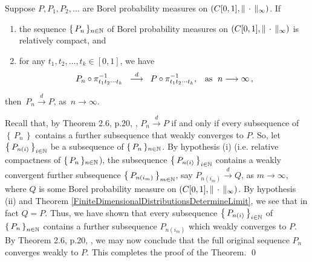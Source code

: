\begin{theorem}
\label{relativeCompactnessFiniteDimensionConvergenceImpliesWeakConvergence}
\mbox{}\vskip 0.1cm
\noindent
Suppose $P, P_{1}, P_{2}, \ldots $ are Borel probability measures on $\left(C[0,1],\Vert\,\cdot\,\Vert_{\infty}\right)$.
If
\begin{enumerate}
\item	the sequence $\{\,P_{n}\,\}_{n\in\mathbb{N}}$ of Borel probability measures
		on $\left(C[0,1],\Vert\,\cdot\,\Vert_{\infty}\right)$ is relatively compact, and
\item	for any $t_{1}, t_{2}, \ldots, t_{k} \in [0,1]$, we have
		\begin{equation*}
		P_{n}\circ\pi_{t_{1}t_{2}\cdots t_{k}}^{-1}
		\;\;\overset{d}{\longrightarrow}\;\;
		P\circ\pi_{t_{1}t_{2}\cdots t_{k}}^{-1},
		\;\;\;
		\textnormal{as \;$n \longrightarrow \infty$}\,,
		\end{equation*}
\end{enumerate}
then \,$P_{n} \overset{d}{\longrightarrow} P$, as \,$n \longrightarrow \infty$.
\end{theorem}
\proof
Recall that, by Theorem 2.6, p.20, \cite{Billingsley1999}, $P_{n} \overset{d}{\longrightarrow} P$ if and only if
every subsequence of $\left\{\,P_{n}\,\right\}$ contains a further subsequence that weakly converges to $P$.
So, let $\left\{\,P_{n(i)}\,\right\}_{i\in\mathbb{N}}$ be a subsequence of $\{\,P_{n}\,\}_{n\in\mathbb{N}}$.
By hypothesis (i) (i.e. relative compactness of $\{\,P_{n}\,\}_{n\in\mathbb{N}}$), the subsequence
$\left\{\,P_{n(i)}\,\right\}_{i\in\mathbb{N}}$ contains a weakly convergent further subsequence
$\left\{\,P_{n(i_{m})}\,\right\}_{m\in\mathbb{N}}$,
say $P_{n(i_{m})} \overset{d}{\longrightarrow} Q$, as $m \longrightarrow \infty$,
where $Q$ is some Borel probability measure on $\left(C[0,1],\Vert\,\cdot\,\Vert_{\infty}\right)$.
By hypothesis (ii) and Theorem \ref{FiniteDimensionalDistributionsDetermineLimit},
we see that in fact $Q = P$.
Thus, we have shown that every subsequence $\left\{\,P_{n(i)}\,\right\}_{i\in\mathbb{N}}$ of
$\left\{\,P_{n}\,\right\}_{n\in\mathbb{N}}$ contains a further subsequence $P_{n(i_{m})}$
which weakly converges to $P$.
By Theorem 2.6, p.20, \cite{Billingsley1999}, we may now conclude that the full original
sequence $P_{n}$ converges weakly to $P$. This completes the proof of the Theorem.
\qed


